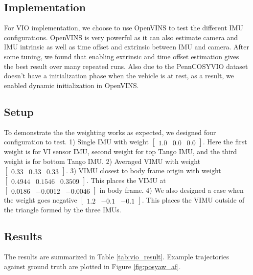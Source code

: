 \documentclass[conference]{IEEEtran}
\begin{document}
\subsection{Implementation}

For VIO implementation, we choose to use OpenVINS \cite{openvins} to test the different IMU configurations. OpenVINS is very powerful as it can also estimate camera and IMU intrinsic as well as time offset and extrinsic between IMU and camera. After some tuning, we found that enabling extrinsic and time offset estimation gives the best result over many repeated runs. Also due to the PennCOSYVIO dataset doesn't have a initialization phase when the vehicle is at rest, as a result, we enabled dynamic initialization in OpenVINS.

\subsection{Setup}

To demonstrate the the weighting works as expected, we designed four configuration to test. 1) Single IMU with weight $[\begin{matrix} 1.0 & 0.0 & 0.0 \end{matrix}]$. Here the first weight is for VI sensor IMU, second weight for top Tango IMU, and the third weight is for bottom Tango IMU. 2) Averaged VIMU with weight $[\begin{matrix} 0.33 & 0.33 & 0.33 \end{matrix}]$. 3) VIMU closest to body frame origin with weight $[\begin{matrix} 0.4944 & 0.1546 & 0.3509 \end{matrix}]$. This places the VIMU at $[\begin{matrix} 0.0186 & -0.0012 & -0.0046 \end{matrix}]$ in body frame. 4) We also designed a case when the weight goes negative $[\begin{matrix} 1.2 & -0.1 & -0.1 \end{matrix}]$. This places the VIMU outside of the triangle formed by the three IMUs.

\subsection{Results}

The results are summarized in Table \ref{tab:vio_result}. Example trajectories against ground truth are plotted in Figure \ref{fig:posyaw_af}.
\end{document}
